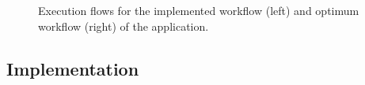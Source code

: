 \begin{figure}[!htp]
	\begin{center}
		\caption{Execution flows for the implemented workflow (left) and optimum workflow (right) of the \tth application.}
		\label{fig:GPUExecFlows}
	\end{center}
\end{figure}

\subsection{Implementation}
\label{GPUImplementation}

